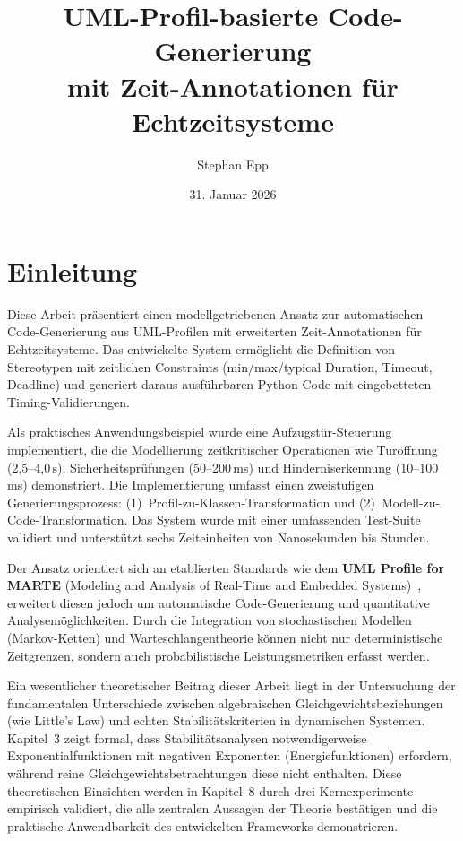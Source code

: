 ﻿\documentclass[a4paper,12pt]{scrreprt}
\title{\textbf{UML-Profil-basierte Code-Generierung}\\
	\large mit Zeit-Annotationen für Echtzeitsysteme}
\author{Stephan Epp}
\date{31. Januar 2026}
\theoremstyle{definition}
\begin{document}
	
\maketitle
\tableofcontents
\newpage

\section{Einleitung}

Diese Arbeit präsentiert einen modellgetriebenen Ansatz zur automatischen
Code-Gene\-rierung aus UML-Profilen mit erweiterten Zeit-Annotationen für
Echtzeitsysteme. Das entwickelte System ermöglicht die Definition von
Stereotypen mit zeitlichen Constraints (min/max/typical Duration, Timeout,
Deadline) und generiert daraus ausführbaren Py\-thon-Code mit eingebetteten
Timing-Validierungen.

Als praktisches Anwendungsbeispiel wurde eine Aufzugstür-Steuerung
implementiert, die die Modellierung zeitkritischer Operationen wie
Türöffnung (2{,}5--4{,}0\,s), Sicherheitsprüfungen (50--200\,ms) und
Hinderniserkennung (10--100\,ms) demonstriert. Die Implementierung umfasst
einen zweistufigen Generierungsprozess: (1)~Profil-zu-Klassen-Transfor\-mation
und (2)~Modell-zu-Code-Transformation. Das System wurde mit einer
umfassenden Test-Suite validiert und unterstützt sechs Zeiteinheiten von
Nanosekunden bis Stunden.

Der Ansatz orientiert sich an etablierten Standards wie dem
\textbf{UML Profile for MARTE} (Modeling and Analysis of Real-Time and
Embedded Systems)~\cite{marte}, erweitert diesen jedoch um automatische
Code-Generierung und quantitative Analysemöglichkeiten. Durch die Integration
von stochastischen Modellen (Markov-Ketten) und Warteschlangentheorie
können nicht nur deterministische Zeitgrenzen, sondern auch probabilistische
Leistungsmetriken erfasst werden.

Ein wesentlicher theoretischer Beitrag dieser Arbeit liegt in der Untersuchung
der fundamentalen Unterschiede zwischen algebraischen Gleichgewichtsbeziehungen
(wie Little's Law) und echten Stabilitätskriterien in dynamischen Systemen.
Kapitel~3 zeigt formal, dass Stabilitätsanalysen notwendigerweise
Exponentialfunktionen mit negativen Exponenten (Energiefunktionen) erfordern,
während reine Gleichgewichtsbetrachtungen diese nicht enthalten. Diese
theoretischen Einsichten werden in Kapitel~8 durch drei Kernexperimente
empirisch validiert, die alle zentralen Aussagen der Theorie bestätigen und
die praktische Anwendbarkeit des entwickelten Frameworks demonstrieren.
\end{document}
